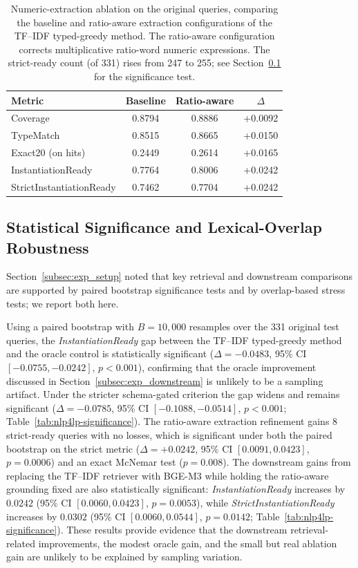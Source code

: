 \documentclass[pdflatex,sn-basic,Numbered]{sn-jnl}
\begin{document}
\begin{table}[t]
  \centering
  \caption{Numeric-extraction ablation on the original queries, comparing the baseline and ratio-aware extraction configurations of the TF--IDF typed-greedy method. The ratio-aware configuration corrects multiplicative ratio-word numeric expressions. The strict-ready count (of 331) rises from 247 to 255; see Section~\ref{subsec:exp_significance} for the significance test.}
  \label{tab:nlp4lp-prefix-postfix}
  \small
  \setlength{\tabcolsep}{4pt}
  \begin{tabular}{lccc}
    \toprule
    Metric & Baseline & Ratio-aware & $\Delta$ \\
    \midrule
    Coverage & 0.8794 & 0.8886 & +0.0092 \\
    TypeMatch & 0.8515 & 0.8665 & +0.0150 \\
    Exact20 (on hits) & 0.2449 & 0.2614 & +0.0165 \\
    InstantiationReady & 0.7764 & 0.8006 & +0.0242 \\
    StrictInstantiationReady & 0.7462 & 0.7704 & +0.0242 \\
    \bottomrule
  \end{tabular}
\end{table}

\subsection{Statistical Significance and Lexical-Overlap Robustness}
\label{subsec:exp_significance}

Section~\ref{subsec:exp_setup} noted that key retrieval and downstream comparisons are supported by paired bootstrap significance tests and by overlap-based stress tests; we report both here.

Using a paired bootstrap with $B=10{,}000$ resamples over the 331 original test queries, the \textit{InstantiationReady} gap between the TF--IDF typed-greedy method and the oracle control is statistically significant ($\Delta=-0.0483$, 95\% CI $[-0.0755,-0.0242]$, $p<0.001$), confirming that the oracle improvement discussed in Section~\ref{subsec:exp_downstream} is unlikely to be a sampling artifact. Under the stricter schema-gated criterion the gap widens and remains significant ($\Delta=-0.0785$, 95\% CI $[-0.1088,-0.0514]$, $p<0.001$; Table~\ref{tab:nlp4lp-significance}). The ratio-aware extraction refinement gains 8 strict-ready queries with no losses, which is significant under both the paired bootstrap on the strict metric ($\Delta=+0.0242$, 95\% CI $[0.0091,0.0423]$, $p=0.0006$) and an exact McNemar test ($p=0.008$). The downstream gains from replacing the TF--IDF retriever with BGE-M3 while holding the ratio-aware grounding fixed are also statistically significant: \textit{InstantiationReady} increases by $0.0242$ (95\% CI $[0.0060, 0.0423]$, $p=0.0053$), while \textit{StrictInstantiationReady} increases by $0.0302$ (95\% CI $[0.0060, 0.0544]$, $p=0.0142$; Table~\ref{tab:nlp4lp-significance}). These results provide evidence that the downstream retrieval-related improvements, the modest oracle gain, and the small but real ablation gain are unlikely to be explained by sampling variation.
\end{document}
